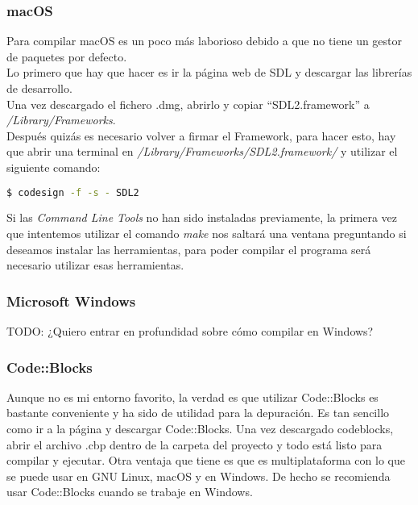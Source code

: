 \documentclass{report}
\begin{document}
\subsubsection{macOS}
Para compilar macOS es un poco más laborioso debido a que no tiene un gestor de paquetes por defecto.
\\ Lo primero que hay que hacer es ir la página web de SDL y descargar las librerías de desarrollo.
\\ Una vez descargado el fichero .dmg, abrirlo y copiar ``SDL2.framework'' a \textit{/Library/Frameworks}.
\\ Después quizás es necesario volver a firmar el Framework, para hacer esto, hay que abrir una terminal en \textit{/Library/Frameworks/SDL2.framework/} y utilizar el siguiente comando:
\begin{lstlisting}[language=bash]
  $ codesign -f -s - SDL2
\end{lstlisting}
Si las \textit{Command Line Tools} no han sido instaladas previamente, la primera vez que intentemos utilizar el comando \textit{make} nos saltará una ventana preguntando si deseamos instalar las herramientas, para poder compilar el programa será necesario utilizar esas herramientas.



\subsubsection{Microsoft Windows}
TODO: ¿Quiero entrar en profundidad sobre cómo compilar en Windows?

\subsubsection{Code::Blocks}
Aunque no es mi entorno favorito, la verdad es que utilizar Code::Blocks es bastante conveniente y ha sido de utilidad para la depuración. Es tan sencillo como ir a la página y descargar Code::Blocks. Una vez descargado codeblocks, abrir el archivo .cbp dentro de la carpeta del proyecto y todo está listo para compilar y ejecutar. Otra ventaja que tiene es que es multiplataforma con lo que se puede usar en GNU Linux, macOS y en Windows. De hecho se recomienda usar Code::Blocks cuando se trabaje en Windows.
\end{document}
